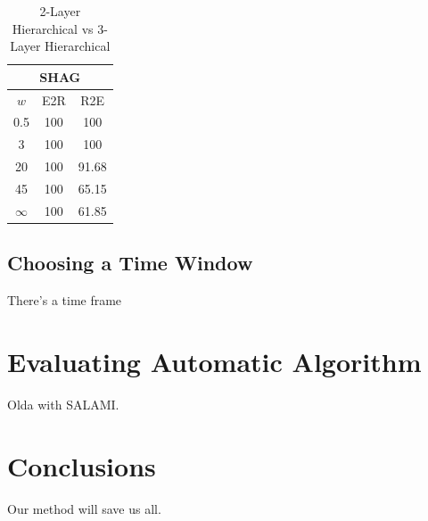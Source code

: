 \documentclass{article}
\begin{document}
\begin{table}
 \begin{center}
   \begin{tabular}{|c|c|c|}
  \hline
  \multicolumn{3}{|c|}{\textbf{SHAG}} \\
  \hline
  $w$       & E2R       & R2E      \\
  \hline
  0.5       & 100       & 100      \\     
  3         & 100       & 100      \\
  20        & 100       & 91.68    \\
  45        & 100       & 65.15    \\
  $\infty$  & 100       & 61.85    \\
  \hline
 \end{tabular}
\end{center}
  \caption{2-Layer Hierarchical vs 3-Layer Hierarchical}
  \label{tab:hier-hiercomp}
\end{table}

\subsection{Choosing a Time Window}

There's a time frame 

\section{Evaluating Automatic Algorithm}

Olda\cite{McFee2014} with SALAMI.




\section{Conclusions}

Our method will save us all.



%
\end{document}
